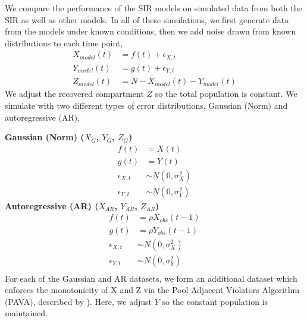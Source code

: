\documentclass[12pt]{article}
\begin{document}
We compare the performance of the SIR models on simulated data from both the SIR as well as other models. In all of these simulations, we first generate data from the models under known conditions, then we add noise drawn from known distributions to each time point,
\begin{align}\label{eq:sim-models}
  X_{model}(t) &= f(t) + \epsilon_{X,t} \\
  Y_{model}(t) &= g(t) + \epsilon_{Y,t} \nonumber\\
  Z_{model}(t) &= N - X_{model}(t) - Y_{model}(t)\nonumber 
\end{align}
We adjust the recovered compartment $Z$ so the total population is constant. 
We simulate with two different types of error distributions, Gaussian (Norm) and autoregressive (AR),

\noindent \textbf{Gaussian (Norm) ($X_{G}$, $Y_{G}$, $Z_{G}$)}
\begin{align*}
  f(t) &= X(t) \\
  g(t) &= Y(t) \\
  \epsilon_{X,t} &\sim N(0, \sigma_X^2) \\
  \epsilon_{Y,t} &\sim N(0, \sigma_Y^2)
\end{align*}
\textbf{Autoregressive (AR) ($X_{AR}$, $Y_{AR}$, $Z_{AR}$)}
\begin{align*}
  f(t) &= \rho X_{obs}(t-1) \\
  g(t) &= \rho Y_{obs}(t-1) \\
  \epsilon_{X,t} &\sim N(0, \sigma_X^2) \\
  \epsilon_{Y,t} &\sim N(0, \sigma_Y^2).\\
\end{align*}
For each of the Gaussian and AR datasets, we form an additional dataset which enforces the monotonicity of X and Z via the Pool Adjacent Violators Algorithm (PAVA), described by \cite{friedman1984}).  Here, we adjust $Y$ so the constant population is maintained.
\end{document}
